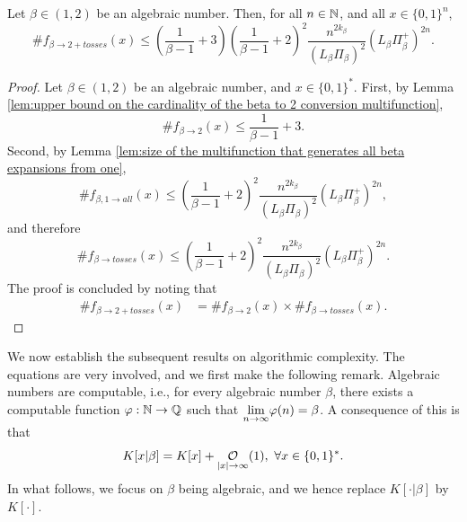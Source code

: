 \begin{lemma}\label{lem:size of the multifunction converting a beta expansion into its noise and the binary expansion}
    Let $\beta \in (1,2)$ be an algebraic number. Then, for all $n \in \mathbb{N}$, and all $x \in \{0,1\}^n$,
    \begin{equation}
        \# f_{\beta \to 2+tosses}(x) \leq \left(\frac{1}{\beta-1} + 3\right) \left(\frac{1}{\beta-1} + 2\right)^2\frac{n^{2k_\beta}}{(L_\beta\Pi_\beta)^2}\left(L_\beta \Pi_\beta^+ \right)^{2n}.
    \end{equation}
\end{lemma}
\begin{proof}
    Let $\beta \in (1,2)$ be an algebraic number, and $x \in \{0,1\}^\ast$. First, by Lemma \ref{lem:upper bound on the cardinality of the beta to 2 conversion multifunction},
    \begin{equation}
        \#f_{\beta \to 2}(x) \leq \frac{1}{\beta-1} + 3.
    \end{equation}
    Second, by Lemma \ref{lem:size of the multifunction that generates all beta expansions from one},
    \begin{equation}
        \#f_{\beta, 1 \to all}(x) \leq \left(\frac{1}{\beta-1} + 2\right)^2\frac{n^{2k_\beta}}{(L_\beta\Pi_\beta)^2}\left(L_\beta \Pi_\beta^+ \right)^{2n},
    \end{equation}
    and therefore 
    \begin{equation}
        \#f_{\beta \to tosses}(x) \leq \left(\frac{1}{\beta-1} + 2\right)^2\frac{n^{2k_\beta}}{(L_\beta\Pi_\beta)^2}\left(L_\beta \Pi_\beta^+ \right)^{2n}.
    \end{equation}
    The proof is concluded by noting that
    \begin{align}
        \# f_{\beta \to 2+tosses}(x) &= \#f_{\beta \to 2}(x)  \times \#f_{\beta \to tosses}(x).
    \end{align}
\end{proof}
We now establish the subsequent results on algorithmic complexity. The equations are very involved, and we first make the following remark. Algebraic numbers are computable, i.e., for every algebraic number $\beta$, there exists a computable function $\varphi: \mathbb{N} \to \mathbb{Q}$ such that $\underset{n \to \infty}{\lim} \varphi(n) = \beta$. A consequence of this is that 
\begin{equation}
    K[x|\beta] = K[x] + \bigOx[1]{|x|}, \ \forall x \in \{0,1\}^\ast.
\end{equation}
In what follows, we focus on $\beta$ being algebraic, and we hence replace $K[\cdot |\beta]$ by $K[\cdot]$.
